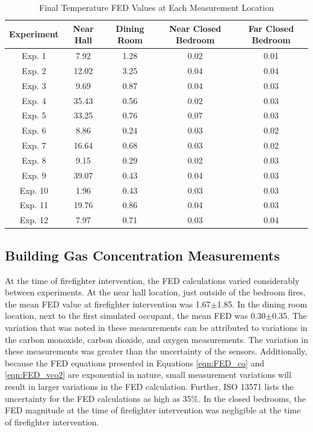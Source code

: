 \documentclass[12pt,oneside]{article}
\begin{document}
\begin{table}[!ht]
    \centering
    \caption{Final Temperature FED Values at Each Measurement Location}
    \label{tab:temp_fed}
    \begin{tabular}{ccccc}
    \toprule[1.5pt]
	\textbf{Experiment}  &   \textbf{Near Hall}& \textbf{Dining Room}& \textbf{Near Closed Bedroom}& \textbf{Far Closed Bedroom} \\ 
	\midrule                                                                   
	Exp. 1 &7.92        & 1.28        		& 0.02     & 0.01        \\  
	Exp. 2 &12.02       & 3.25       		& 0.04     & 0.04        \\
	Exp. 3 & 9.69    	& 0.87        		& 0.04     & 0.03        \\               
	Exp. 4 & 35.43      & 0.56         		& 0.02     & 0.03        \\                
	Exp. 5 & 33.25      & 0.76          	& 0.07     & 0.03        \\                 
	Exp. 6 & 8.86       & 0.24         		& 0.03     & 0.02        \\                 
	Exp. 7 & 16.64      & 0.68         		& 0.03     & 0.02        \\                
	Exp. 8 & 9.15       & 0.29         		& 0.02     & 0.03        \\            
	Exp. 9 & 39.07      & 0.43          	& 0.04     & 0.03        \\              
	Exp. 10& 1.96       & 0.43          	& 0.03     & 0.03        \\         
	Exp. 11& 19.76      & 0.86           	& 0.04     & 0.03        \\             
	Exp. 12& 7.97       & 0.71          	& 0.03     & 0.04        \\           
	\bottomrule[1.25pt] 

    \end{tabular}
\end{table}                   
\subsection{Building Gas Concentration Measurements}
\label{subsec:gas}
At the time of firefighter intervention, the FED calculations varied considerably between experiments. At the near hall location, just outside of the bedroom fires,  the mean FED value at firefighter intervention was 1.67$\pm$1.85. In the dining room location, next to the first simulated occupant, the mean FED was 0.30$\pm$0.35. The variation that was noted in these measurements can be attributed to variations in the carbon monoxide, carbon dioxide, and oxygen measurements. The variation in these measurements was greater than the uncertainty of the sensors. Additionally, because the FED equations presented in Equations \ref{eqn:FED_co} and \ref{eqn:FED_vco2} are exponential in nature, small measurement variations will result in larger variations in the FED calculation. Further, ISO 13571 \cite{ISO13571} lists the uncertainty for the FED calculations as high as 35\%. In the closed bedrooms, the FED magnitude at the time of firefighter intervention was negligible at the time of firefighter intervention. 
\end{document}
